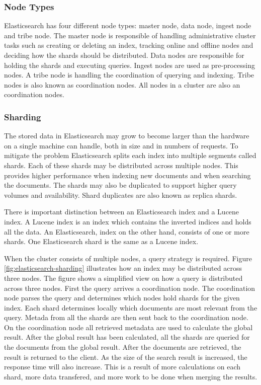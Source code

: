 \subsubsection{Node Types}
Elasticsearch has four different node types: master node, data node, ingest node and tribe node.
The master node is responsible of handling administrative cluster tasks such as
creating or deleting an index, tracking online and offline nodes and deciding how the shards should be distributed.
Data nodes are responsible for holding the shards and executing queries.
Ingest nodes are used as pre-processing nodes.
A tribe node is handling the coordination of querying and indexing.
Tribe nodes is also known as coordination nodes.
All nodes in a cluster are also an coordination nodes.

\subsubsection{Sharding}
The stored data in Elasticsearch may grow to become larger than the hardware on a single machine can handle,
both in size and in numbers of requests.
To mitigate the problem Elasticsearch splits each index into multiple segments called shards.
Each of these shards may be distributed across multiple nodes.
This provides higher performance when indexing new documents and when searching the documents.
The shards may also be duplicated to support higher query volumes and availability.
Shard duplicates are also known as replica shards.

There is important distinction between an Elasticsearch index and a Lucene index.
A Lucene index is an index which contains the inverted indices and holds all the data.
An Elasticsearch, index on the other hand, consists of one or more shards.
One Elasticsearch shard is the same as a Lucene index.

When the cluster consists of multiple nodes, a query strategy is required.
Figure \ref{fig:elasticsearch-sharding} illustrates how an index may be distributed across three nodes.
The figure shows a simplified view on how a query is distributed across three nodes.
First the query arrives a coordination node.
The coordination node parses the query and determines which nodes hold shards for the given index.
Each shard determines locally which documents are most relevant from the query.
Metada from all the shards are then sent back to the coordination node.
On the coordination node all retrieved metadata are used to calculate the global result.
After the global result has been calculated,
all the shards are queried for the documents from the global result.
After the documents are retrieved, the result is returned to the client.
As the size of the search result is increased, the response time will also increase.
This is a result of more calculations on each shard,
more data transfered,
and more work to be done when merging the results.

